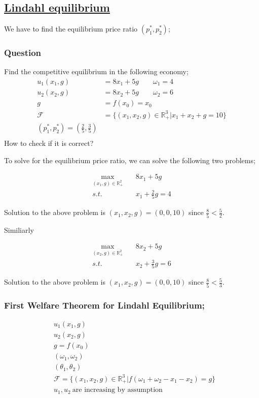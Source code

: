 \documentclass[12pt,a4paper,fleqn]{article}
\begin{document}
\subsection{\underline{Lindahl equilibrium}}
We have to find the equilibrium price ratio \(\left( p_{1}^*,p_{2}^* \right) \);
\subsubsection{Question} 
Find the competitive equilibrium in the following economy;
 \begin{align*}
    u_{1}(x_{1},g)&= 8x_{1} + 5g \qquad \omega_{1}=4 \\
    u_{2}(x_{2},g)&= 8x_{2} + 5g \qquad \omega_{2}=6 \\
    g&=f(x_{0})= x_{0}\\
    \mathcal{F}&= \{(x_{1},x_{2},g) \in \mathbb{R}^3_{+} | x_{1}+x_{2}+g=10\} \\
    \left( p_{1}^*,p_{2}^* \right) = \left( \frac{2}{5},\frac{3}{5} \right) \\
\end{align*}
How to check if it is correct?

To solve for the equilibrium price ratio, we can solve the following two problems;
\begin{tcolorbox}
    \begin{align*}
        \max_{(x_{1},g)\in \mathbb{R}^{2}_{+}} & \quad 8x_{1} + 5g \\
        s.t. &  \quad x_{1} + \frac{2}{5}g=4
  \end{align*}   
\end{tcolorbox}
Solution to the above problem is \(\left( x_{1},x_{2},g \right) = \left( 0,0,10 \right) \) since \(\frac{8}{5}<\frac{5}{2}\).   

Similiarly

\begin{tcolorbox}
    \begin{align*}
        \max_{(x_{2},g)\in \mathbb{R}^{2}_{+}} & \quad 8x_{2} + 5g \\
        s.t. &  \quad x_{2} + \frac{3}{5}g=6
  \end{align*}   
\end{tcolorbox}
Solution to the above problem is \(\left( x_{1},x_{2},g \right) = \left( 0,0,10 \right) \) since \(\frac{8}{5}<\frac{5}{3}\).   

 \subsubsection{First Welfare Theorem for Lindahl Equilibrium;} 
 \begin{align*}
    &u_{1}(x_{1},g) \\
    &u_{2}(x_{2},g) \\
    &g=f(x_{0}) \\
    &(\omega_{1},\omega_{2}) \\
    &(\theta_{1},\theta_{2})\\
    &\mathcal{F}= \{(x_{1},x_{2},g) \in \mathbb{R}^3_{+} | f(\omega_{1}+ \omega_{2} -x_{1}-x_{2})=g\} \\
    &u_{1}, u_{2} \ \text{are increasing by assumption}
\end{align*}
\end{document}
